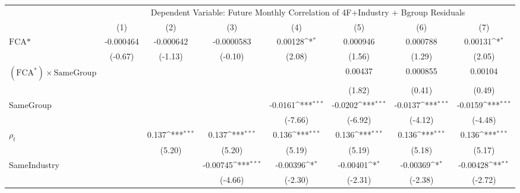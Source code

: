 {
\def\sym#1{\ifmmode^{#1}\else\(^{#1}\)\fi}
\begin{tabular}{l*{7}{c}}
\hline\hline
                &\multicolumn{7}{c}{Dependent Variable: Future Monthly Correlation of 4F+Industry + Bgroup Residuals}                                \\\cmidrule(lr){2-8}
                &\multicolumn{1}{c}{(1)}         &\multicolumn{1}{c}{(2)}         &\multicolumn{1}{c}{(3)}         &\multicolumn{1}{c}{(4)}         &\multicolumn{1}{c}{(5)}         &\multicolumn{1}{c}{(6)}         &\multicolumn{1}{c}{(7)}         \\
\hline
$ \text{FCA*} $ &-0.000464         &-0.000642         &-0.0000583         &  0.00128\sym{*}  & 0.000946         & 0.000788         &  0.00131\sym{*}  \\
                &  (-0.67)         &  (-1.13)         &  (-0.10)         &   (2.08)         &   (1.56)         &   (1.29)         &   (2.05)         \\
[1em]
 $ (\text{FCA}^*) \times {\text{SameGroup} }  $ &                  &                  &                  &                  &  0.00437         & 0.000855         &  0.00104         \\
                &                  &                  &                  &                  &   (1.82)         &   (0.41)         &   (0.49)         \\
[1em]
SameGroup       &                  &                  &                  &  -0.0161\sym{***}&  -0.0202\sym{***}&  -0.0137\sym{***}&  -0.0159\sym{***}\\
                &                  &                  &                  &  (-7.66)         &  (-6.92)         &  (-4.12)         &  (-4.48)         \\
[1em]
 $ {\rho_t} $   &                  &    0.137\sym{***}&    0.137\sym{***}&    0.136\sym{***}&    0.136\sym{***}&    0.136\sym{***}&    0.136\sym{***}\\
                &                  &   (5.20)         &   (5.20)         &   (5.19)         &   (5.19)         &   (5.18)         &   (5.17)         \\
[1em]
SameIndustry    &                  &                  & -0.00745\sym{***}& -0.00396\sym{*}  & -0.00401\sym{*}  & -0.00369\sym{*}  & -0.00428\sym{**} \\
                &                  &                  &  (-4.66)         &  (-2.30)         &  (-2.31)         &  (-2.38)         &  (-2.72)         \\

\end{tabular}}
